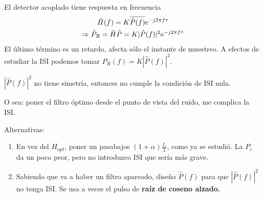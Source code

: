 El detector acoplado tiene respuesta en frecuencia
\begin{gather*}
 \hat{H}(f) = K \overline{\hat{P}(f)} \mathrm{e}^{-j2\pi f\tau}\\
 \Rightarrow \hat{P}_R = \hat{H}\hat{P} = K |\hat{P}(f)|^2 \mathrm{e}^{-j2\pi f \tau}
\end{gather*}
El último término es un retardo, afecta sólo el instante de
muestreo. A efectos de estudiar la ISI podemos tomar $P_R(f) =
K|\hat{P}(f)|^2$.
\begin{figure}[htb]
 \begin{center}\begin{minipage}{\textwidth}
   \endpgfgraphicnamed\end{minipage}
 \end{center}

\end{figure}

$|\hat{P}(f)|^2$ no tiene simetría, entonces no cumple la condición de ISI nula.

O sea: poner el filtro óptimo desde el punto de vista del ruido,
me complica la ISI.

\newpage    %

Alternativas:
\begin{enumerate}
 \item En vez del $H_{opt}$, poner un pasabajos $(1+\alpha)\frac{f_s}{2}$, como ya se estudió. La $P_e$ da un poco peor,
 pero no introduzco ISI que sería más grave.
 \item Sabiendo que va a haber un filtro apareado, diseño $\hat{P}(f)$ para que $|\hat{P}(f)|^2$ no tenga ISI.
 Se usa a veces el pulso de {\bf raíz de coseno alzado.}
\end{enumerate}


